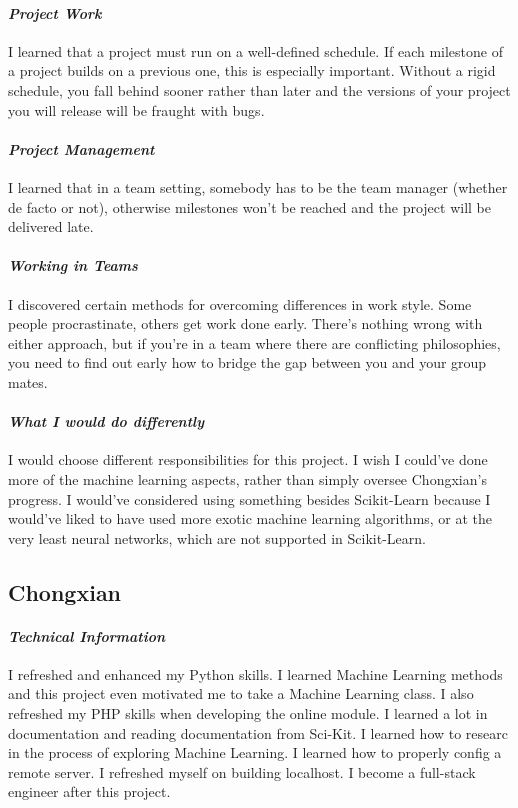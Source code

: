 \documentclass[onecolumn, draftclsnofoot,10pt, compsoc]{IEEEtran}
\begin{document}
\paragraph{\emph{Project Work}}
I learned that a project must run on a well-defined schedule. If each milestone of a project builds on a previous one, this is especially important. Without a rigid schedule, you fall behind sooner rather than later and the versions of your project you will release will be fraught with bugs. 

\paragraph{\emph{Project Management}}
I learned that in a team setting, somebody has to be the team manager (whether de facto or not), otherwise milestones won't be reached and the project will be delivered late. 

\paragraph{\emph{Working in Teams}}
I discovered certain methods for overcoming differences in work style. Some people procrastinate, others get work done early. There's nothing wrong with either approach, but if you're in a team where there are conflicting philosophies, you need to find out early how to bridge the gap between you and your group mates.

\paragraph{\emph{What I would do differently}}
I would choose different responsibilities for this project. I wish I could've done more of the machine learning aspects, rather than simply oversee Chongxian's progress. I would've considered using something besides Scikit-Learn  because I would've liked to have used more exotic machine learning algorithms, or at the very least neural networks, which are not supported in Scikit-Learn.


\subsection{Chongxian}
\paragraph{\emph{Technical Information}}
I refreshed and enhanced my Python skills. I learned Machine Learning methods and this project even motivated me to take a Machine Learning class. I also refreshed my PHP skills when developing the online module. I learned a lot in documentation and reading documentation from Sci-Kit. I learned how to researc in the process of exploring Machine Learning. I learned how to properly config a remote server. I refreshed myself on building localhost. I become a full-stack engineer after this project.
\end{document}
